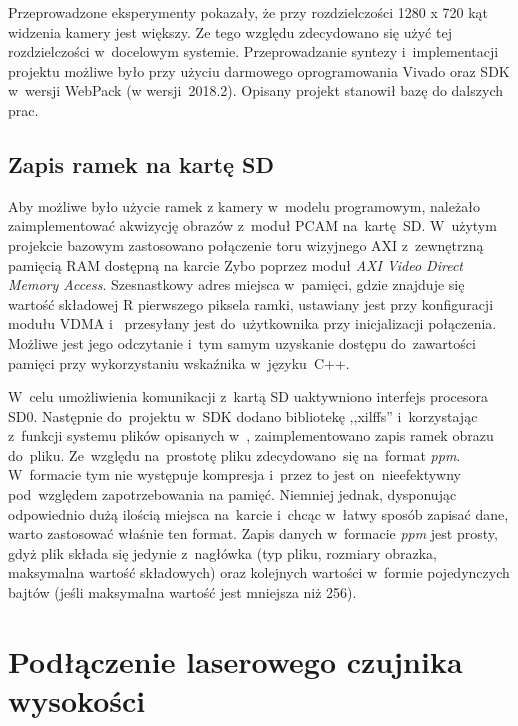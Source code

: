 Przeprowadzone eksperymenty pokazały, że przy rozdzielczości 1280 x 720 kąt widzenia kamery jest większy. 
Ze tego względu zdecydowano się użyć tej rozdzielczości w~docelowym systemie.
Przeprowadzanie syntezy i~implementacji projektu możliwe było przy użyciu darmowego oprogramowania Vivado oraz SDK w~wersji WebPack (w wersji~2018.2). 
Opisany projekt stanowił bazę do dalszych prac.

\subsection{Zapis ramek na kartę SD}
\label{sec:image_sd}
Aby możliwe było użycie ramek z kamery w~modelu programowym, należało zaimplementować akwizycję obrazów z~moduł PCAM na~kartę~SD. 
W~użytym projekcie bazowym zastosowano połączenie toru wizyjnego AXI z~zewnętrzną pamięcią RAM dostępną na karcie Zybo poprzez moduł \textit{AXI Video Direct Memory Access}. 
Szesnastkowy adres miejsca w~pamięci, gdzie znajduje się wartość składowej R pierwszego piksela ramki, ustawiany jest przy konfiguracji modułu VDMA i~ przesyłany jest do~użytkownika przy inicjalizacji połączenia. 
Możliwe jest jego odczytanie i~tym samym uzyskanie dostępu do~zawartości pamięci przy wykorzystaniu wskaźnika w~języku~C++.

W~celu umożliwienia komunikacji z~kartą SD uaktywniono interfejs procesora SD0. 
Następnie do~projektu w~SDK dodano bibliotekę ,,xilffs'' i~korzystając z~funkcji systemu plików opisanych w~\cite{xilffs}, zaimplementowano zapis ramek obrazu do~pliku. 
Ze~względu na~prostotę pliku zdecydowano~się na~format \textit{ppm}. 
W~formacie tym nie występuje kompresja i~przez to jest on~nieefektywny pod~względem zapotrzebowania na pamięć.
Niemniej jednak, dysponując odpowiednio dużą ilością miejsca na~karcie i~chcąc w~łatwy sposób zapisać dane, warto zastosować właśnie ten format. 
Zapis danych w~formacie \textit{ppm} jest prosty, gdyż plik składa się jedynie z~nagłówka (typ pliku, rozmiary obrazka, maksymalna wartość składowych) oraz kolejnych wartości w~formie pojedynczych bajtów (jeśli maksymalna wartość jest mniejsza niż 256).  



\section{Podłączenie laserowego czujnika wysokości}
\label{subsec:podlaczenie_lasera}


